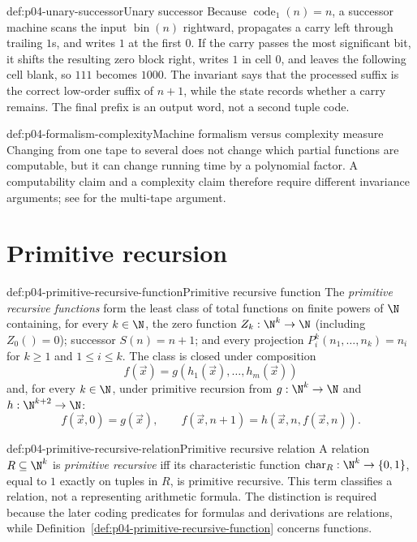 \begin{hbexample}{def:p04-unary-successor}{Unary successor}
Because \(\operatorname{code}_1(n)=n\), a successor machine scans the input
\(\operatorname{bin}(n)\) rightward, propagates a carry left through trailing
\(1\)s, and writes \(1\) at the first \(0\).  If the carry passes the most
significant bit, it shifts the resulting zero block right, writes \(1\) in
cell \(0\), and leaves the following cell blank, so \(111\) becomes
\(1000\).  The invariant says that the
processed suffix is the correct low-order suffix of \(n+1\), while the state
records whether a carry remains.  The final prefix is an output word, not a
second tuple code.
\end{hbexample}

\begin{hbwarning}{def:p04-formalism-complexity}{Machine formalism versus complexity measure}
Changing from one tape to several does not change which partial functions are
computable, but it can change running time by a polynomial factor.  A
computability claim and a complexity claim therefore require different
invariance arguments; see \cite{BoolosBurgessJeffrey2007} for the multi-tape
argument.
\end{hbwarning}

\section{Primitive recursion}
\label{sec:p04-primitive-recursion}

\begin{hbdefinition}{def:p04-primitive-recursive-function}{Primitive recursive function}
The \emph{primitive recursive functions} form the least class of total
functions on finite powers of \(\N\) containing, for every \(k\in\N\), the
zero function \(Z_k:\N^k\to\N\) (including \(Z_0()=0\)); successor
\(S(n)=n+1\); and every projection
\(P_i^k(n_1,\ldots,n_k)=n_i\) for \(k\ge1\) and \(1\le i\le k\).  The class
is closed under composition
\[
  f(\vec x)=g(h_1(\vec x),\ldots,h_m(\vec x))
\]
and, for every \(k\in\N\), under primitive recursion from
\(g:\N^k\to\N\) and \(h:\N^{k+2}\to\N\):
\[
  f(\vec x,0)=g(\vec x),
  \qquad
  f(\vec x,n+1)=h(\vec x,n,f(\vec x,n)).
\]
\end{hbdefinition}

\begin{hbdefinition}{def:p04-primitive-recursive-relation}{Primitive recursive relation}
A relation \(R\subseteq\N^k\) is \emph{primitive recursive} iff its
characteristic function \(\operatorname{char}_R:\N^k\to\{0,1\}\), equal to \(1\) exactly
on tuples in \(R\), is primitive recursive.  This term classifies a relation,
not a representing arithmetic formula.  The distinction is required because
the later coding predicates for formulas and derivations are relations, while
Definition~\ref{def:p04-primitive-recursive-function} concerns functions.
\end{hbdefinition}

